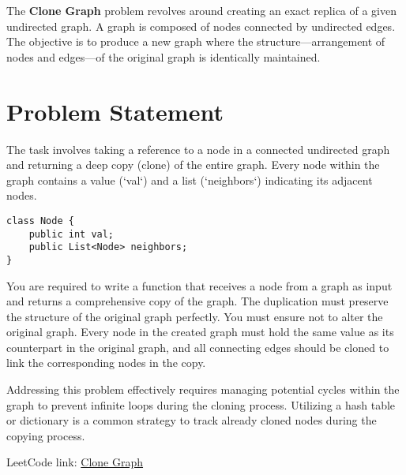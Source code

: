 
\label{problem:clone_graph}

The \textbf{Clone Graph} problem revolves around creating an exact replica of a given undirected graph. A graph is composed of nodes connected by undirected edges. The objective is to produce a new graph where the structure—arrangement of nodes and edges—of the original graph is identically maintained.

\section*{Problem Statement}
The task involves taking a reference to a node in a connected undirected graph and returning a deep copy (clone) of the entire graph. Every node within the graph contains a value (`val`) and a list (`neighbors`) indicating its adjacent nodes.

\begin{verbatim}
class Node {
    public int val;
    public List<Node> neighbors;
}
\end{verbatim}

You are required to write a function that receives a node from a graph as input and returns a comprehensive copy of the graph. The duplication must preserve the structure of the original graph perfectly. You must ensure not to alter the original graph. Every node in the created graph must hold the same value as its counterpart in the original graph, and all connecting edges should be cloned to link the corresponding nodes in the copy.

Addressing this problem effectively requires managing potential cycles within the graph to prevent infinite loops during the cloning process. Utilizing a hash table or dictionary is a common strategy to track already cloned nodes during the copying process.

LeetCode link: \href{https://leetcode.com/problems/clone-graph/}{Clone Graph}


